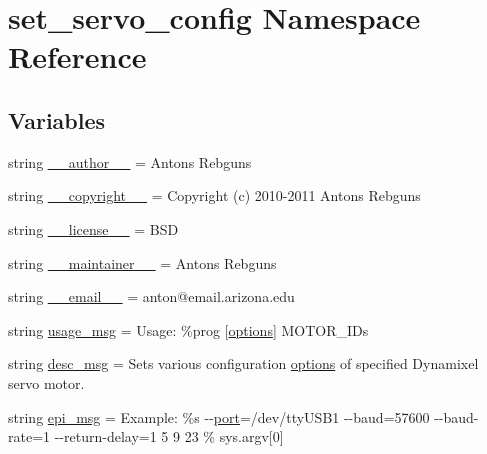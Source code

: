 \hypertarget{namespaceset__servo__config}{}\section{set\+\_\+servo\+\_\+config Namespace Reference}
\label{namespaceset__servo__config}
\subsection*{Variables}
\begin{DoxyCompactItemize}
\item 
string \hyperlink{namespaceset__servo__config_a6c87761f52b72b3a67e61fb679984c38}{\+\_\+\+\_\+author\+\_\+\+\_\+} = \textquotesingle{}Antons Rebguns\textquotesingle{}
\item 
string \hyperlink{namespaceset__servo__config_a37c50f86efd31fee525e1895d440e7e9}{\+\_\+\+\_\+copyright\+\_\+\+\_\+} = \textquotesingle{}Copyright (c) 2010-\/2011 Antons Rebguns\textquotesingle{}
\item 
string \hyperlink{namespaceset__servo__config_a5d14a3f08337b7e9454f331f6be3b13f}{\+\_\+\+\_\+license\+\_\+\+\_\+} = \textquotesingle{}B\+SD\textquotesingle{}
\item 
string \hyperlink{namespaceset__servo__config_af8b78e367a7eb720592591d46b7b417c}{\+\_\+\+\_\+maintainer\+\_\+\+\_\+} = \textquotesingle{}Antons Rebguns\textquotesingle{}
\item 
string \hyperlink{namespaceset__servo__config_acf8611fa0f240e986d0cc2bb33d5e08f}{\+\_\+\+\_\+email\+\_\+\+\_\+} = \textquotesingle{}anton@email.\+arizona.\+edu\textquotesingle{}
\item 
string \hyperlink{namespaceset__servo__config_afb62a54e4938e903420f62984507fdd8}{usage\+\_\+msg} = \textquotesingle{}Usage\+: \%prog \mbox{[}\hyperlink{namespaceset__servo__config_ac255726a992a254f0b0e6072b0f86233}{options}\mbox{]} M\+O\+T\+O\+R\+\_\+\+I\+Ds\textquotesingle{}
\item 
string \hyperlink{namespaceset__servo__config_a8e653627e0edc71d67503af40c92f022}{desc\+\_\+msg} = \textquotesingle{}Sets various configuration \hyperlink{namespaceset__servo__config_ac255726a992a254f0b0e6072b0f86233}{options} of specified Dynamixel servo motor.\textquotesingle{}
\item 
string \hyperlink{namespaceset__servo__config_a5c22d68865380f08b6c332373297893a}{epi\+\_\+msg} = \textquotesingle{}Example\+: \%s -\/-\/\hyperlink{namespaceset__servo__config_a324ec25da2c0124a9184e551f96f1419}{port}=/dev/tty\+U\+S\+B1 -\/-\/baud=57600 -\/-\/baud-\/rate=1 -\/-\/return-\/delay=1 5 9 23\textquotesingle{} \% sys.\+argv\mbox{[}0\mbox{]}

\end{DoxyCompactItemize}
